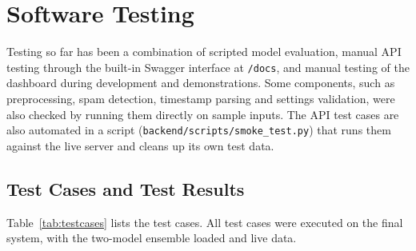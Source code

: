 \documentclass[12pt,a4paper]{report}
\begin{document}
\section{Software Testing}

Testing so far has been a combination of scripted model evaluation, manual API testing through the built-in Swagger interface at \texttt{/docs}, and manual testing of the dashboard during development and demonstrations. Some components, such as preprocessing, spam detection, timestamp parsing and settings validation, were also checked by running them directly on sample inputs. The API test cases are also automated in a script (\texttt{backend/scripts/smoke\_test.py}) that runs them against the live server and cleans up its own test data.

\subsection{Test Cases and Test Results}

Table~\ref{tab:testcases} lists the test cases. All test cases were executed on the final system, with the two-model ensemble loaded and live data.
\end{document}
